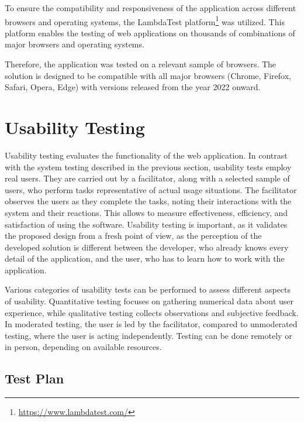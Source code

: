 To ensure the compatibility and responsiveness of the application across different browsers and operating systems, the LambdaTest platform\footnote{\url{https://www.lambdatest.com/}} was utilized. This platform enables the testing of web applications on thousands of combinations of major browsers and operating systems.~\cite{LambdaTest}

Therefore, the application was tested on a relevant sample of browsers. The solution is designed to be compatible with all major browsers (Chrome, Firefox, Safari, Opera, Edge) with versions released from the year 2022 onward.


\section{Usability Testing}

Usability testing evaluates the functionality of the web application. In contrast with the system testing described in the previous section, usability tests employ real users. They are carried out by a facilitator, along with a selected sample of users, who perform tasks representative of actual usage situations. The facilitator observes the users as they complete the tasks, noting their interactions with the system and their reactions. This allows to measure effectiveness, efficiency, and satisfaction of using the software. Usability testing is important, as it validates the proposed design from a fresh point of view, as the perception of the developed solution is different between the developer, who already knows every detail of the application, and the user, who has to learn how to work with the application.~\cite{Barnum2021}

Various categories of usability tests can be performed to assess different aspects of usability. Quantitative testing focuses on gathering numerical data about user experience, while qualitative testing collects observations and subjective feedback. In moderated testing, the user is led by the facilitator, compared to unmoderated testing, where the user is acting independently. Testing can be done remotely or in person, depending on available resources.~\cite{Moran2019}


\subsection{Test Plan}

